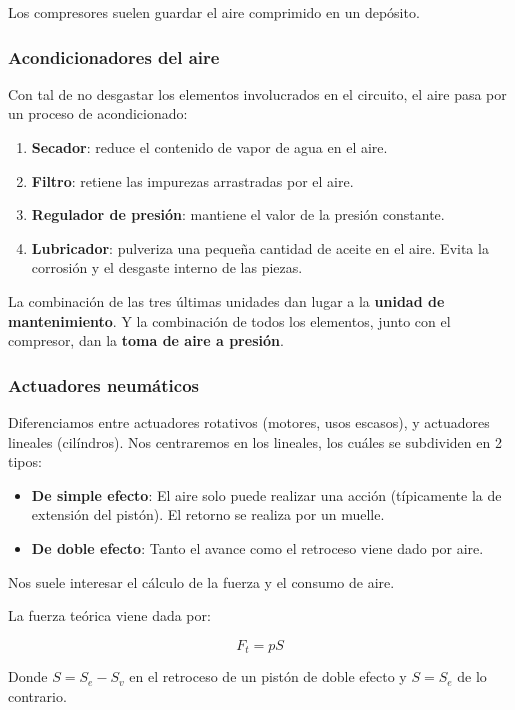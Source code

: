 \documentclass[10pt]{article}
\begin{document}
Los compresores suelen guardar el aire comprimido en un depósito.

\subsubsection{Acondicionadores del aire}

Con tal de no desgastar los elementos involucrados en el circuito, el aire pasa por un proceso de acondicionado:

\begin{enumerate}
  \item \textbf{Secador}: reduce el contenido de vapor de agua en el aire.
  \item \textbf{Filtro}: retiene las impurezas arrastradas por el aire.
  \item \textbf{Regulador de presión}: mantiene el valor de la presión constante.
  \item \textbf{Lubricador}: pulveriza una pequeña cantidad de aceite en el aire. Evita la corrosión y el desgaste interno
    de las piezas.
\end{enumerate}

La combinación de las tres últimas unidades dan lugar a la \textbf{unidad de mantenimiento}. Y la combinación de todos los
elementos, junto con el compresor, dan la \textbf{toma de aire a presión}.

\subsubsection{Actuadores neumáticos}

Diferenciamos entre actuadores rotativos (motores, usos escasos), y actuadores lineales (cilíndros). Nos centraremos en los lineales, los cuáles se subdividen en 2 tipos:

\begin{itemize}
  \item \textbf{De simple efecto}: El aire solo puede realizar una acción (típicamente la de extensión del pistón). El retorno se realiza por un muelle.
  \item \textbf{De doble efecto}: Tanto el avance como el retroceso viene dado por aire.
\end{itemize}

Nos suele interesar el cálculo de la fuerza y el consumo de aire.

La fuerza teórica viene dada por:

\[ F_t = p S \]

Donde $ S = S_e - S_v  $ en el retroceso de un pistón de doble efecto y $ S = S_e $ de lo contrario.
\end{document}
